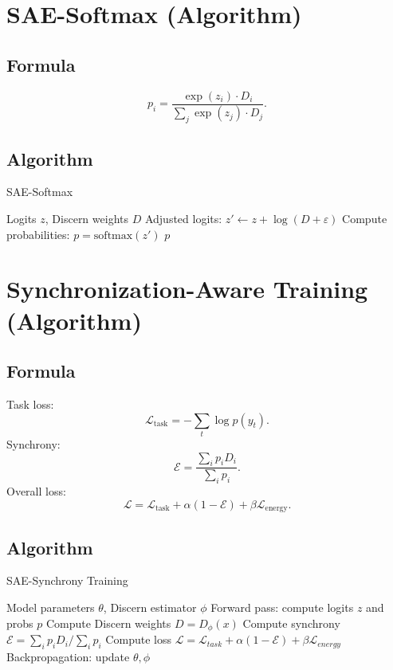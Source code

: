 \documentclass[11pt]{article}
\theoremstyle{plain}
\theoremstyle{definition}
\theoremstyle{remark}
\begin{document}
\section{SAE-Softmax (Algorithm)}

\subsection{Formula}
\[
p_i = \frac{\exp(z_i)\cdot D_i}{\sum_j \exp(z_j)\cdot D_j}.
\]

\subsection{Algorithm}

\begin{algorithm}[h]
\caption{SAE-Softmax}
\begin{algorithmic}[1]
\REQUIRE Logits $z$, Discern weights $D$
\STATE Adjusted logits: $z' \gets z + \log(D + \varepsilon)$
\STATE Compute probabilities: $p = \text{softmax}(z')$
\RETURN $p$
\end{algorithmic}
\end{algorithm}

\section{Synchronization-Aware Training (Algorithm)}

\subsection{Formula}
Task loss:
\[
\mathcal{L}_{\text{task}} = -\sum_t \log p(y_t).
\]
Synchrony:
\[
\mathcal{E} = \frac{\sum_i p_i D_i}{\sum_i p_i}.
\]
Overall loss:
\[
\mathcal{L} = \mathcal{L}_{\text{task}} + \alpha (1-\mathcal{E}) + \beta \mathcal{L}_{\text{energy}}.
\]

\subsection{Algorithm}

\begin{algorithm}[h]
\caption{SAE-Synchrony Training}
\begin{algorithmic}[1]
\REQUIRE Model parameters $\theta$, Discern estimator $\phi$
  \STATE Forward pass: compute logits $z$ and probs $p$
  \STATE Compute Discern weights $D = D_\phi(x)$
  \STATE Compute synchrony $\mathcal{E} = \sum_i p_i D_i / \sum_i p_i$
  \STATE Compute loss $\mathcal{L} = \mathcal{L}_{task} + \alpha(1-\mathcal{E}) + \beta\mathcal{L}_{energy}$
  \STATE Backpropagation: update $\theta, \phi$
\ENDFOR
\end{algorithmic}
\end{algorithm}
\end{document}
